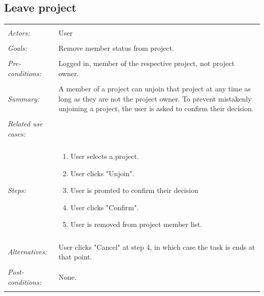 \documentclass[11pt]{report}
\begin{document}
\subsection{Leave project}
\begin{tabular}{ p{2cm} p{12cm} }
 \hline
 \\
 \textit{Actors:} & User \\ 
 \\
 \textit{Goals:} & Remove member status from project. \\
 \\
 \textit{Pre-conditions:} & Logged in, member of the respective project, not project owner.  \\
\\
 \textit{Summary:} & A member of a project can unjoin that project at any time as long as they are not the project owner. To prevent mistakenly unjoining a project, the user is asked to confirm their decision.\\ 
 \\
 \textit{Related use cases:} & \\ 
 \\
 \textit{Steps:} & \begin{enumerate}
  \item User selects a project.
  \item User clicks "Unjoin". 
  \item User is promted to confirm their decision
  \item User clicks "Confirm".
  \item User is removed from project member list.    
 \end{enumerate} \\
 \\
 \textit{Alternatives:} & User clicks "Cancel" at step 4, in which case the task is ends at that point. \\
 \\
 \textit{Post-conditions:} & None. \\
 \\
\hline
\end{tabular}
\end{document}
